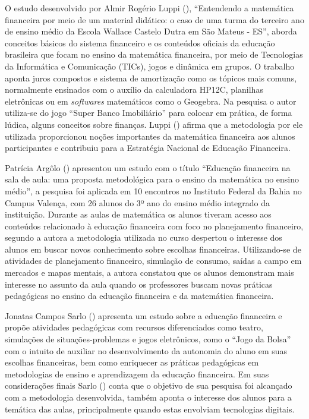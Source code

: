 O estudo desenvolvido por Almir Rogério Luppi (\citeyear{luppi2018}), “Entendendo a matemática financeira por meio de um material didático: o caso de uma turma do terceiro ano de ensino médio da Escola Wallace Castelo Dutra em São Mateus - ES”, aborda conceitos básicos do sistema financeiro e os conteúdos oficiais da educação brasileira que focam no ensino da matemática financeira, por meio de Tecnologias da Informática e Comunicação (TICs), jogos e dinâmica em grupos. O trabalho aponta juros compostos e sistema de amortização como os tópicos mais comuns, normalmente ensinados com o auxílio da calculadora HP12C, planilhas eletrônicas ou em \textit{softwares} matemáticos como o Geogebra. Na pesquisa o autor utiliza-se do jogo “Super Banco Imobiliário” para colocar em prática, de forma lúdica, alguns conceitos sobre finanças. Luppi (\citeyear{luppi2018}) afirma que a metodologia por ele utilizada proporcionou noções importantes da matemática financeira aos alunos participantes e contribuiu para a Estratégia Nacional de Educação Financeira.

Patrícia Argôlo (\citeyear{patricia-argolo2018}) apresentou um estudo com o título “Educação financeira na sala de aula: uma proposta metodológica para o ensino da matemática no ensino médio”, a pesquisa foi aplicada em 10 encontros no Instituto Federal da Bahia no Campus Valença, com 26 alunos do 3º ano do ensino médio integrado da instituição. Durante as aulas de matemática os alunos tiveram acesso aos conteúdos relacionado à educação financeira com foco no planejamento financeiro, segundo a autora a metodologia utilizada no curso despertou o interesse dos alunos em buscar novos conhecimento sobre escolhas financeiras. Utilizando-se de atividades de planejamento financeiro, simulação de consumo, saídas a campo em mercados e mapas mentais, a autora constatou que os alunos demonstram mais interesse no assunto da aula quando os professores buscam novas práticas pedagógicas no ensino da educação financeira e da matemática financeira.

Jonatas Campos Sarlo (\citeyear{sarlo2019}) apresenta um estudo sobre a educação financeira e propõe atividades pedagógicas com recursos diferenciados como teatro, simulações de situações-problemas e jogos eletrônicos, como o “Jogo da Bolsa” com o intuito de auxiliar no desenvolvimento da autonomia do aluno em suas escolhas financeiras, bem como enriquecer as práticas pedagógicas em metodologias de ensino e aprendizagem da educação financeira. Em suas considerações finais Sarlo (\citeyear{sarlo2019}) conta que o objetivo de sua pesquisa foi alcançado com a metodologia desenvolvida, também aponta o interesse dos alunos para a temática das aulas, principalmente quando estas envolviam tecnologias digitais.

